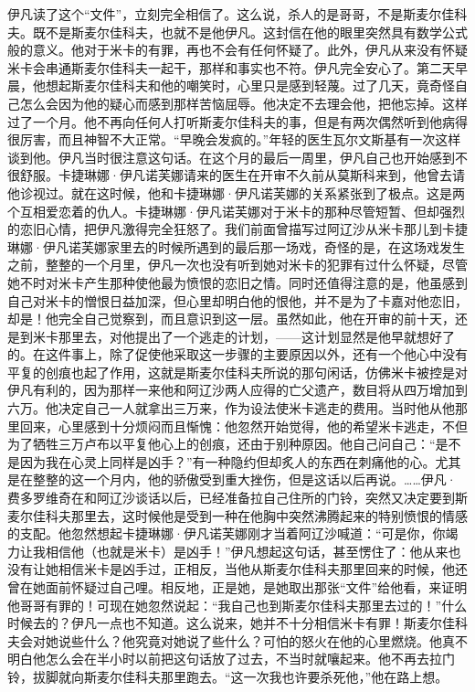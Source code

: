 \par 伊凡读了这个“文件”，立刻完全相信了。这么说，杀人的是哥哥，不是斯麦尔佳科夫。既不是斯麦尔佳科夫，也就不是他伊凡。这封信在他的眼里突然具有数学公式般的意义。他对于米卡的有罪，再也不会有任何怀疑了。此外，伊凡从来没有怀疑米卡会串通斯麦尔佳科夫一起干，那样和事实也不符。伊凡完全安心了。第二天早晨，他想起斯麦尔佳科夫和他的嘲笑时，心里只是感到轻蔑。过了几天，竟奇怪自己怎么会因为他的疑心而感到那样苦恼屈辱。他决定不去理会他，把他忘掉。这样过了一个月。他不再向任何人打听斯麦尔佳科夫的事，但是有两次偶然听到他病得很厉害，而且神智不大正常。“早晚会发疯的。”年轻的医生瓦尔文斯基有一次这样谈到他。伊凡当时很注意这句话。在这个月的最后一周里，伊凡自己也开始感到不很舒服。卡捷琳娜·伊凡诺芙娜请来的医生在开审不久前从莫斯科来到，他曾去请他诊视过。就在这时候，他和卡捷琳娜·伊凡诺芙娜的关系紧张到了极点。这是两个互相爱恋着的仇人。卡捷琳娜·伊凡诺芙娜对于米卡的那种尽管短暂、但却强烈的恋旧心情，把伊凡激得完全狂怒了。我们前面曾描写过阿辽沙从米卡那儿到卡捷琳娜·伊凡诺芙娜家里去的时候所遇到的最后那一场戏，奇怪的是，在这场戏发生之前，整整的一个月里，伊凡一次也没有听到她对米卡的犯罪有过什么怀疑，尽管她不时对米卡产生那种使他最为愤恨的恋旧之情。同时还值得注意的是，他虽感到自己对米卡的憎恨日益加深，但心里却明白他的恨他，并不是为了卡嘉对他恋旧，却是！他完全自己觉察到，而且意识到这一层。虽然如此，他在开审的前十天，还是到米卡那里去，对他提出了一个逃走的计划，——这计划显然是他早就想好了的。在这件事上，除了促使他采取这一步骤的主要原因以外，还有一个他心中没有平复的创痕也起了作用，这就是斯麦尔佳科夫所说的那句闲话，仿佛米卡被控是对伊凡有利的，因为那样一来他和阿辽沙两人应得的亡父遗产，数目将从四万增加到六万。他决定自己一人就拿出三万来，作为设法使米卡逃走的费用。当时他从他那里回来，心里感到十分烦闷而且惭愧：他忽然开始觉得，他的希望米卡逃走，不但为了牺牲三万卢布以平复他心上的创痕，还由于别种原因。他自己问自己：“是不是因为我在心灵上同样是凶手？”有一种隐约但却炙人的东西在刺痛他的心。尤其是在整整的这一个月内，他的骄傲受到重大挫伤，但是这话以后再说。……伊凡·费多罗维奇在和阿辽沙谈话以后，已经准备拉自己住所的门铃，突然又决定要到斯麦尔佳科夫那里去，这时候他是受到一种在他胸中突然沸腾起来的特别愤恨的情感的支配。他忽然想起卡捷琳娜·伊凡诺芙娜刚才当着阿辽沙喊道：“可是你，你竭力让我相信他（也就是米卡）是凶手！”伊凡想起这句话，甚至愣住了：他从来也没有让她相信米卡是凶手过，正相反，当他从斯麦尔佳科夫那里回来的时候，他还曾在她面前怀疑过自己哩。相反地，正是她，是她取出那张“文件”给他看，来证明他哥哥有罪的！可现在她忽然说起：“我自己也到斯麦尔佳科夫那里去过的！”什么时候去的？伊凡一点也不知道。这么说来，她并不十分相信米卡有罪！斯麦尔佳科夫会对她说些什么？他究竟对她说了些什么？可怕的怒火在他的心里燃烧。他真不明白他怎么会在半小时以前把这句话放了过去，不当时就嚷起来。他不再去拉门铃，拔脚就向斯麦尔佳科夫那里跑去。“这一次我也许要杀死他，”他在路上想。
